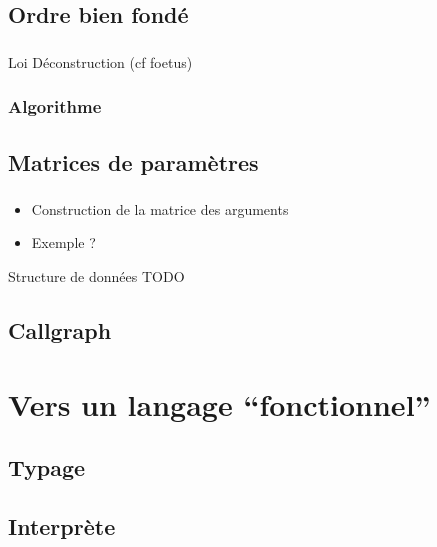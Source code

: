 \subsection{Ordre bien fondé}

\begin{frame}
  \frametitle{}
  \begin{block}{Loi}
    Déconstruction (cf foetus)
  \end{block}
\end{frame}

\begin{frame}
  \frametitle{Algorithme}
\end{frame}

\subsection{Matrices de paramètres}

\begin{frame}
  \frametitle{}
  \begin{block}{}
    \begin{itemize}
      \item Construction de la matrice des arguments
      \item Exemple ?
    \end{itemize}
  \end{block}
  \begin{block}{Structure de données}
    TODO
  \end{block}
\end{frame}

\subsection{Callgraph}

\begin{frame}
  \frametitle{}
  \begin{block}{}
  \end{block}
\end{frame}

\section{Vers un langage ``fonctionnel''}

\subsection{Typage}

\begin{frame}
  \frametitle{}
  \begin{block}{}
  \end{block}
\end{frame}

\subsection{Interprète}

\begin{frame}
  \frametitle{}
  \begin{block}{}
  \end{block}
\end{frame}
